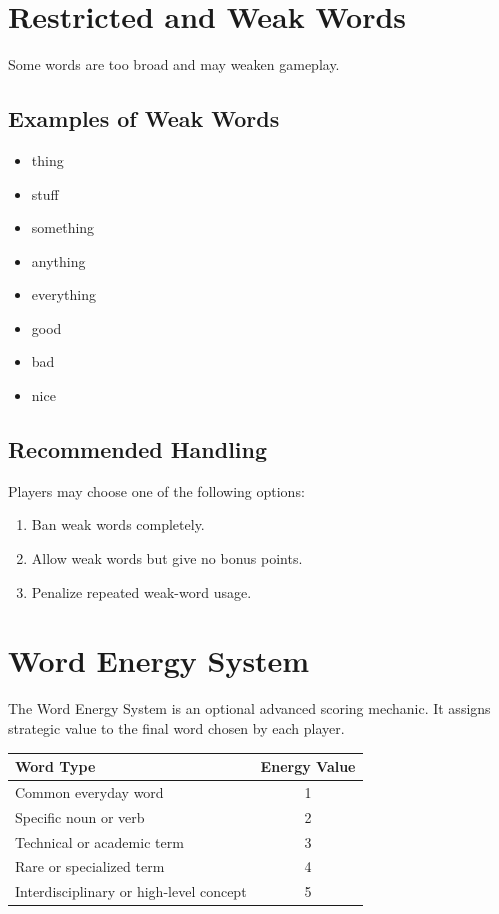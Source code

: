\documentclass[11pt,a4paper]{article}
\begin{document}
\section{Restricted and Weak Words}

Some words are too broad and may weaken gameplay.

\subsection{Examples of Weak Words}

\begin{itemize}
    \item thing
    \item stuff
    \item something
    \item anything
    \item everything
    \item good
    \item bad
    \item nice
\end{itemize}

\subsection{Recommended Handling}

Players may choose one of the following options:

\begin{enumerate}
    \item Ban weak words completely.
    \item Allow weak words but give no bonus points.
    \item Penalize repeated weak-word usage.
\end{enumerate}

\section{Word Energy System}

The Word Energy System is an optional advanced scoring mechanic. It assigns strategic value to the final word chosen by each player.

\begin{center}
\begin{tabular}{lc}
\toprule
\textbf{Word Type} & \textbf{Energy Value} \\
\midrule
Common everyday word & 1 \\
Specific noun or verb & 2 \\
Technical or academic term & 3 \\
Rare or specialized term & 4 \\
Interdisciplinary or high-level concept & 5 \\
\bottomrule
\end{tabular}
\end{center}
\end{document}
